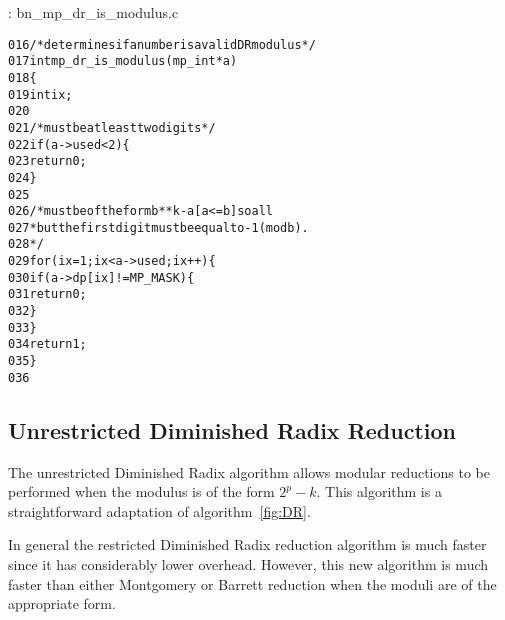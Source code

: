 \documentclass[b5paper]{book}
\begin{document}
\vspace{+3mm}\begin{small}
\hspace{-5.1mm}{\bf File}: bn\_mp\_dr\_is\_modulus.c
\vspace{-3mm}
\begin{alltt}
016   /* determines if a number is a valid DR modulus */
017   int mp_dr_is_modulus(mp_int *a)
018   \{
019      int ix;
020   
021      /* must be at least two digits */
022      if (a->used < 2) \{
023         return 0;
024      \}
025   
026      /* must be of the form b**k - a [a <= b] so all
027       * but the first digit must be equal to -1 (mod b).
028       */
029      for (ix = 1; ix < a->used; ix++) \{
030          if (a->dp[ix] != MP_MASK) \{
031             return 0;
032          \}
033      \}
034      return 1;
035   \}
036   
\end{alltt}
\end{small}

\subsection{Unrestricted Diminished Radix Reduction}
The unrestricted Diminished Radix algorithm allows modular reductions to be performed when the modulus is of the form $2^p - k$.  This algorithm
is a straightforward adaptation of algorithm~\ref{fig:DR}.

In general the restricted Diminished Radix reduction algorithm is much faster since it has considerably lower overhead.  However, this new
algorithm is much faster than either Montgomery or Barrett reduction when the moduli are of the appropriate form.
\end{document}
